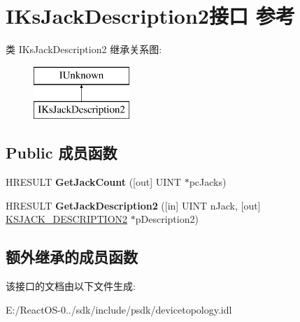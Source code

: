 \hypertarget{interface_i_ks_jack_description2}{}\section{I\+Ks\+Jack\+Description2接口 参考}
\label{interface_i_ks_jack_description2}
类 I\+Ks\+Jack\+Description2 继承关系图\+:\begin{figure}[H]
\begin{center}
\leavevmode
\includegraphics[height=2.000000cm]{interface_i_ks_jack_description2}
\end{center}
\end{figure}
\subsection*{Public 成员函数}
\begin{DoxyCompactItemize}
\item 
\mbox{\label{interface_i_ks_jack_description2_a78e81ad9fed52f884343179ce42e1835}} 
H\+R\+E\+S\+U\+LT {\bfseries Get\+Jack\+Count} (\mbox{[}out\mbox{]} U\+I\+NT $\ast$pc\+Jacks)
\item 
\mbox{\label{interface_i_ks_jack_description2_a2ca747de769a74583883c2dfcf13e8ff}} 
H\+R\+E\+S\+U\+LT {\bfseries Get\+Jack\+Description2} (\mbox{[}in\mbox{]} U\+I\+NT n\+Jack, \mbox{[}out\mbox{]} \hyperlink{struct__tag_k_s_j_a_c_k___d_e_s_c_r_i_p_t_i_o_n2}{K\+S\+J\+A\+C\+K\+\_\+\+D\+E\+S\+C\+R\+I\+P\+T\+I\+O\+N2} $\ast$p\+Description2)
\end{DoxyCompactItemize}
\subsection*{额外继承的成员函数}


该接口的文档由以下文件生成\+:\begin{DoxyCompactItemize}
\item 
E\+:/\+React\+O\+S-\/0../sdk/include/psdk/devicetopology.\+idl\end{DoxyCompactItemize}
